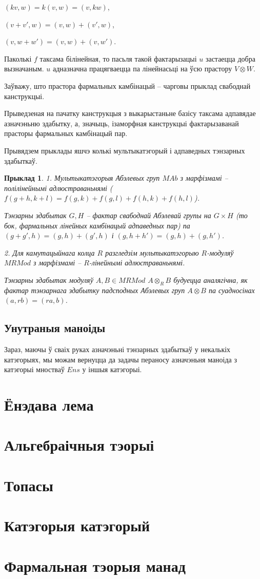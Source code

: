 \documentclass[a4paper,12pt]{book}
\newtheorem{example}{Прыклад}[section]
\begin{document}
$(kv, w) = k(v, w) = (v, kw)$,

$(v + v', w) = (v, w) + (v', w)$,

$(v, w + w') = (v, w) + (v, w')$.

Паколькі $f$ таксама білінейная, то пасьля такой фактарызацыі $u$
застаецца добра вызначаным. $u$ адназначна працягваецца па лінейнасьці
на ўсю прастору $V \otimes W$.

Заўважу, што прастора фармальных камбінацый -- чарговы прыклад
свабоднай канструкцыі.

Прыведзеная на пачатку канструкцыя з выкарыстаньне базісу таксама
адпавядае азначэньню здабытку, а, значыць, ізаморфная канструкцыі
фактарызаванай прасторы фармальных камбінацый пар.

Прывядзем прыклады яшчэ колькі мультыкатэгорый і адпаведных тэнзарных
здабыткаў.

\begin{example}
  1. Мультыкатэгорыя Абэлевых груп $MAb$ з марфізмамі -- полілінейнымі
  адлюстраваньнямі ($f(g + h, k + l) = f(g, k) + f(g, l) + f(h, k) +
  f(h, l)$).

  Тэнзарны здабытак $G, H$ -- фактар свабоднай Абэлевай групы на $G
  \times H$ (то бок, фармальных лінейных камбінацый адпаведных пар) па
  $(g + g', h) = (g, h) + (g', h)$ і $(g, h + h') = (g, h) + (g, h')$.

  2. Для камутацыйнага колца $R$ разгледзім мультыкатэгорыю
  $R$-модуляў $MRMod$ з марфізмамі -- $R$-лінейнымі адлюстраваньнямі.

  Тэнзарны здабытак модуляў $A, B \in MRMod$ $A \otimes_R B$ будуецца
  аналягічна, як фактар тэнзарнага здабытку падсподных Абэлевых груп
  $A \otimes B$ па суадносінах $(a, rb) = (ra, b)$.
\end{example}

\section{Унутраныя маноіды}

Зараз, маючы ў сваіх руках азначэньні тэнзарных здабыткаў у некалькіх
катэгорыях, мы можам вернуцца да задачы пераносу азначэньня маноіда з
катэгорыі мностваў $Ens$ у іншыя катэгорыі.

\chapter{Ёнэдава лема}

\chapter{Альгебраічныя тэорыі}

\chapter{Топасы}

\chapter{Катэгорыя катэгорый}

\chapter{Фармальная тэорыя манад}
\end{document}
